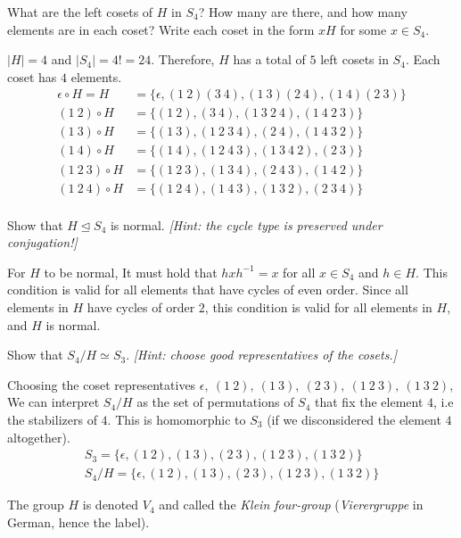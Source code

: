 \begin{problem}
\begin{enumalph}
\begin{Answer}
      \noindent
    \end{Answer}

    \item What are the left cosets of $H$ in $S_4$?
      How many are there, and how many elements are in each coset?
      Write each coset in the form $xH$ for some $x \in S_4$.
    \begin{Answer}
      $|H| = 4$ and $|S_4| = 4! = 24$.
      Therefore, $H$ has a total of $5$ left cosets in $S_4$.
      Each coset has $4$ elements.
      \begin{align*}
        \epsilon \circ H = H &= \{\epsilon,(1\ 2)(3\ 4),(1\ 3)(2\ 4),(1\ 4)(2\ 3)\} \\
        (1\ 2) \circ H &= \{(1\ 2), (3\ 4), (1\ 3\ 2\ 4), (1\ 4\ 2\ 3)\} \\
        (1\ 3) \circ H &= \{(1\ 3), (1\ 2\ 3\ 4), (2\ 4), (1\ 4\ 3\ 2)\} \\
        (1\ 4) \circ H &= \{(1\ 4), (1\ 2\ 4\ 3), (1\ 3\ 4\ 2), (2\ 3)\} \\
        (1\ 2\ 3) \circ H &= \{(1\ 2\ 3), (1\ 3\ 4), (2\ 4\ 3), (1\ 4\ 2)\} \\
        (1\ 2\ 4) \circ H &= \{(1\ 2\ 4), (1\ 4\ 3), (1\ 3\ 2), (2\ 3\ 4)\} \\
      \end{align*}
    \end{Answer}
    \item Show that $H \trianglelefteq S_4$ is normal.  \emph{[Hint: the cycle type is 
    preserved under conjugation!]}
    \begin{Answer}
      For $H$ to be normal,
      It must hold that $hxh^{-1} = x$ for all $x \in S_4$ and $h \in H$.
      This condition is valid for all elements that have cycles of even order.
      Since all elements in $H$ have cycles of order $2$, 
      this condition is valid for all elements in $H$,
      and $H$ is normal.
    \end{Answer}
    \item Show that $S_4/H \simeq S_3$.  \emph{[Hint: choose good representatives of 
    the cosets.]}
    \begin{Answer}
      Choosing the coset representatives
      $\epsilon,\ (1\ 2),\ (1\ 3),\ (2\ 3),\ (1\ 2\ 3),\ (1\ 3\ 2)$,
      We can interpret $S_4/H$ as the set of permutations of $S_4$ that fix the element $4$,
      i.e the stabilizers of $4$.
      This is homomorphic to $S_3$ (if we disconsidered the element $4$ altogether).
      \begin{align*}
        S_3 = \{\epsilon, (1\ 2), (1\ 3), (2\ 3), (1\ 2\ 3), (1\ 3\ 2)\} \\
        S_4/H = \{\epsilon, (1\ 2), (1\ 3), (2\ 3), (1\ 2\ 3), (1\ 3\ 2)\}
      \end{align*}

    \end{Answer}
  \end{enumalph}
  The group $H$ is denoted $V_4$ and called the \emph{Klein four-group}
  (\emph{Vierergruppe} in German, hence the label).  
\end{problem}
